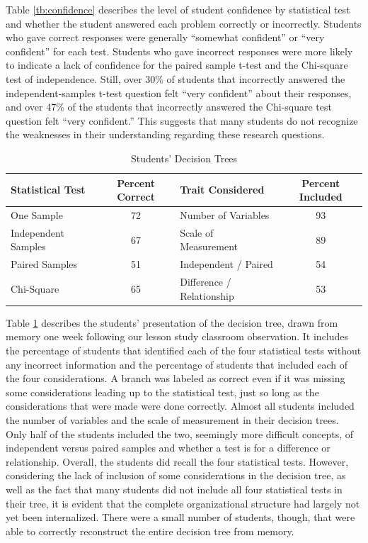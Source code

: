 \documentclass[12pt]{article}
\begin{document}
Table \ref{tb:confidence} describes the level of student confidence by statistical test and whether the student answered each problem correctly or incorrectly.  Students who gave correct responses were generally ``somewhat confident'' or ``very confident'' for each test.  Students who gave incorrect responses were more likely to indicate a lack of confidence for the paired sample t-test and the Chi-square test of independence.  Still, over 30\% of students that incorrectly answered the independent-samples t-test question felt ``very confident'' about their responses, and over 47\% of the students that incorrectly answered the Chi-square test question felt ``very confident.''  This suggests that many students do not recognize the weaknesses in their understanding regarding these research questions.

\begin{table}\caption{Students' Decision Trees}\label{tb:trees}\vspace*{1pc}
\begin{tabular}{l|c||l|c}
Statistical Test & Percent Correct & Trait Considered & Percent Included \\ \hline
One Sample & 72 & Number of Variables & 93 \\
Independent Samples & 67 & Scale of Measurement & 89 \\
Paired Samples & 51 & Independent / Paired & 54 \\
Chi-Square & 65 & Difference / Relationship & 53 \\ \hline
\end{tabular}
\end{table}

Table \ref{tb:trees} describes the students' presentation of the decision tree, drawn from memory one week following our lesson study classroom observation.  It includes the percentage of students that identified each of the four statistical tests without any incorrect information and the percentage of students that included each of the four considerations.  A branch was labeled as correct even if it was missing some considerations leading up to the statistical test, just so long as the considerations that were made were done correctly.   Almost all students included the number of variables and the scale of measurement in their decision trees.  Only half of the students included the two, seemingly more difficult concepts, of independent versus paired samples and whether a test is for a difference or relationship.  Overall, the students did recall the four statistical tests.  However, considering the lack of inclusion of some considerations in the decision tree, as well as the fact that many students did not include all four statistical tests in their tree, it is evident that the complete organizational structure had largely not yet been internalized.  There were a small number of students, though, that were able to correctly reconstruct the entire decision tree from memory.
\end{document}
